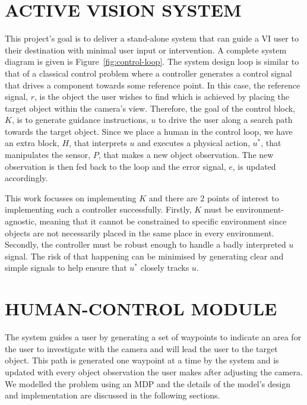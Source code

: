 \documentclass[a4paper, twoside]{article}
\begin{document}
\section{\uppercase{Active Vision System}}\label{sec:system-design}

\noindent This project's goal is to deliver a stand-alone system that can guide a VI user to their destination with minimal user input or intervention. A complete system diagram is given is Figure~\ref{fig:control-loop}. The system design loop is similar to that of a classical control problem where a controller generates a control signal that drives a component towards some reference point. In this case, the reference signal, $r$, is the object the user wishes to find which is achieved by placing the target object within the camera's view. Therefore, the goal of the control block, $K$, is to generate guidance instructions, $u$ to drive the user along a search path towards the target object. Since we place a human in the control loop, we have an extra block, $H$, that interprets $u$ and executes a physical action, $u^*$, that manipulates the sensor, $P$, that makes a new object observation. The new observation is then fed back to the loop and the error signal, $e$, is updated accordingly.  

This work focusses on implementing $K$ and there are 2 points of interest to implementing such a controller successfully. Firstly, $K$ must be environment-agnostic, meaning that it cannot be constrained to specific environment since objects are not necessarily placed in the same place in every environment. Secondly, the controller must be robust enough to handle a badly interpreted $u$ signal. The risk of that happening can be minimised by generating clear and simple signals to help ensure that $u^*$ closely tracks $u$. 

\section{\uppercase{Human-control Module}}\label{sec:controller-design}

\noindent The system guides a user by generating a set of waypoints to indicate an area for the user to investigate with the camera and will lead the user to the target object. This path is generated one waypoint at a time by the system and is updated with every object observation the user makes after adjusting the camera. We modelled the problem using an MDP and the details of the model's design and implementation are discussed in the following sections. %
\end{document}
